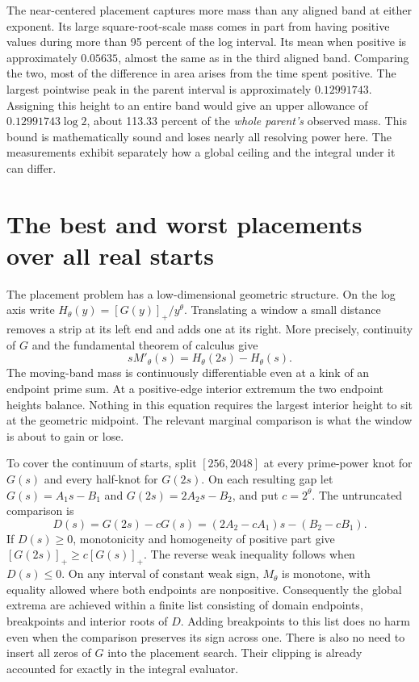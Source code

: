 \documentclass[12pt,letterpaper]{article}
\begin{document}
The near-centered placement captures more mass than any aligned band at either exponent. Its large square-root-scale mass comes in part from having positive values during more than 95 percent of the log interval. Its mean when positive is approximately $0.05635$, almost the same as in the third aligned band. Comparing the two, most of the difference in area arises from the time spent positive. The largest pointwise peak in the parent interval is approximately $0.12991743$. Assigning this height to an entire band would give an upper allowance of $0.12991743\log2$, about 113.33 percent of the \emph{whole parent's} observed mass. This bound is mathematically sound and loses nearly all resolving power here. The measurements exhibit separately how a global ceiling and the integral under it can differ.

\section{The best and worst placements over all real starts}
\label{sec:band-prime-scan}

The placement problem has a low-dimensional geometric structure. On the log axis write $H_\theta(y)=[G(y)]_+/y^\theta$. Translating a window a small distance removes a strip at its left end and adds one at its right. More precisely, continuity of $G$ and the fundamental theorem of calculus give
\[
 sM'_\theta(s)=H_\theta(2s)-H_\theta(s).
\]
The moving-band mass is continuously differentiable even at a kink of an endpoint prime sum. At a positive-edge interior extremum the two endpoint heights balance. Nothing in this equation requires the largest interior height to sit at the geometric midpoint. The relevant marginal comparison is what the window is about to gain or lose.

To cover the continuum of starts, split $[256,2048]$ at every prime-power knot for $G(s)$ and every half-knot for $G(2s)$. On each resulting gap let $G(s)=A_1s-B_1$ and $G(2s)=2A_2s-B_2$, and put $c=2^\theta$. The untruncated comparison is
\[
 D(s)=G(2s)-cG(s)=(2A_2-cA_1)s-(B_2-cB_1).
\]
If $D(s)\geq0$, monotonicity and homogeneity of positive part give $[G(2s)]_+\geq c[G(s)]_+$. The reverse weak inequality follows when $D(s)\leq0$. On any interval of constant weak sign, $M_\theta$ is monotone, with equality allowed where both endpoints are nonpositive. Consequently the global extrema are achieved within a finite list consisting of domain endpoints, breakpoints and interior roots of $D$. Adding breakpoints to this list does no harm even when the comparison preserves its sign across one. There is also no need to insert all zeros of $G$ into the placement search. Their clipping is already accounted for exactly in the integral evaluator.
\end{document}
